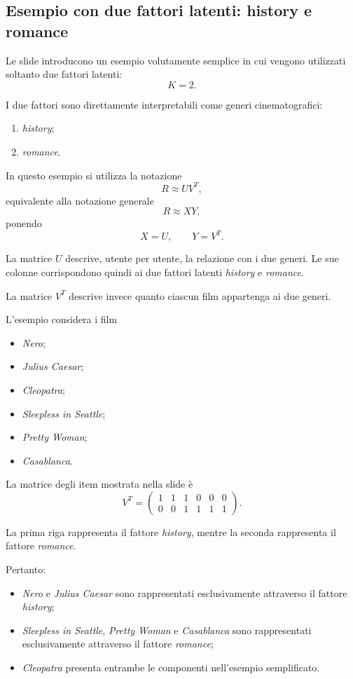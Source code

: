 \subsection{Esempio con due fattori latenti: history e romance}

Le slide introducono un esempio volutamente semplice in cui vengono utilizzati soltanto due fattori latenti:
\[
K=2.
\]

I due fattori sono direttamente interpretabili come generi cinematografici:
\begin{enumerate}
    \item \emph{history};
    \item \emph{romance}.
\end{enumerate}

In questo esempio si utilizza la notazione
\[
R \approx UV^{T},
\]
equivalente alla notazione generale
\[
R \approx XY,
\]
ponendo
\[
X=U,
\qquad
Y=V^{T}.
\]

La matrice $U$ descrive, utente per utente, la relazione con i due generi. Le sue colonne corrispondono quindi ai due fattori latenti \emph{history} e \emph{romance}.

La matrice $V^{T}$ descrive invece quanto ciascun film appartenga ai due generi.

L'esempio considera i film
\begin{itemize}
    \item \emph{Nero};
    \item \emph{Julius Caesar};
    \item \emph{Cleopatra};
    \item \emph{Sleepless in Seattle};
    \item \emph{Pretty Woman};
    \item \emph{Casablanca}.
\end{itemize}

La matrice degli item mostrata nella slide è
\[
V^{T}
=
\begin{pmatrix}
1 & 1 & 1 & 0 & 0 & 0\\
0 & 0 & 1 & 1 & 1 & 1
\end{pmatrix}.
\]

La prima riga rappresenta il fattore \emph{history}, mentre la seconda rappresenta il fattore \emph{romance}.

Pertanto:
\begin{itemize}
    \item \emph{Nero} e \emph{Julius Caesar} sono rappresentati esclusivamente attraverso il fattore \emph{history};
    \item \emph{Sleepless in Seattle}, \emph{Pretty Woman} e \emph{Casablanca} sono rappresentati esclusivamente attraverso il fattore \emph{romance};
    \item \emph{Cleopatra} presenta entrambe le componenti nell'esempio semplificato.
\end{itemize}

